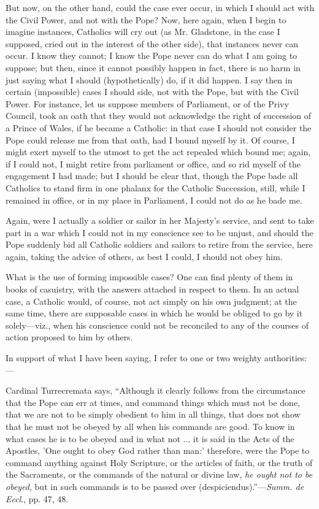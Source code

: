 But now, on the other hand, could the case ever occur, in which I
should act with the Civil Power, and not with the Pope? Now, here again,
when I begin to imagine instances, Catholics will cry out (as Mr.
Gladstone, in the case I supposed, cried out in the interest of the
other side), that instances never can occur. I know they cannot; I know
the Pope never can do what I am going to suppose; but then, since it
cannot possibly happen in fact, there is no harm in just saying what I
should (hypothetically) do, if it did happen. I say then in certain
(impossible) cases I should side, not with the Pope, but with the Civil
Power. For instance, let us suppose members of Parliament, or of the
Privy Council, took an oath that they would not acknowledge the right of
succession of a Prince of Wales, if he became a Catholic: in that case I
should not consider the Pope could release me from that oath, had I
bound myself by it. Of course, I might exert myself to the utmost to get
the act repealed which bound me; again, if I could not, I might retire
from parliament or office, and so rid myself of the engagement I had
made; but I should be clear that, though the Pope bade all Catholics to
stand firm in one phalanx for the Catholic Succession, still, while I
remained in office, or in my place in Parliament, I could not do as he
bade me.

Again, were I actually a soldier or sailor in her Majesty's service, and sent to take part in a war which I could not in my
conscience see to be unjust, and should the Pope suddenly bid all
Catholic soldiers and sailors to retire from the service, here again,
taking the advice of others, as best I could, I should not obey him.

What is the use of forming impossible cases? One can find plenty of
them in books of casuistry, with the answers attached in respect to
them. In an actual case, a Catholic would, of course, not act simply on
his own judgment; at the same time, there are supposable cases in which
he would be obliged to go by it solely—viz., when his conscience could
not be reconciled to any of the courses of action proposed to him by
others.

In support of what I have been saying, I refer to one or two weighty
authorities:—

Cardinal Turrecremata says, ``Although it clearly follows from
the circumstance that the Pope can err at times, and command things
which must not be done, that we are not to be simply obedient to him in
all things, that does not show that he must not be obeyed by all when
his commands are good. To know in what cases he is to be obeyed and in
what not ... it is said in the Acts of the Apostles, 'One ought to obey
God rather than man:' therefore, were the Pope to command anything
against Holy Scripture, or the articles of faith, or the truth of the
Sacraments, or the commands of the natural or divine law, \emph{he ought
not to be obeyed}, but in such commands is to be passed over (despiciendus).''—\emph{Summ.
de Eccl}., pp. 47, 48.

